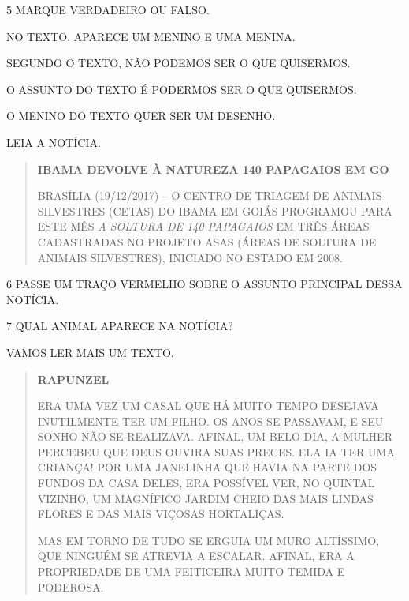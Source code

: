 
\pagebreak

\num{5} MARQUE VERDADEIRO OU FALSO.

\begin{boxlist}
 NO TEXTO, APARECE UM MENINO E UMA MENINA.

 SEGUNDO O TEXTO, NÃO PODEMOS SER O QUE QUISERMOS.

 O ASSUNTO DO TEXTO É PODERMOS SER O QUE QUISERMOS.

 O MENINO DO TEXTO QUER SER UM DESENHO.
\end{boxlist}

LEIA A NOTÍCIA.

\begin{quote}
\textbf{IBAMA DEVOLVE À NATUREZA 140 PAPAGAIOS EM GO}

BRASÍLIA (19/12/2017) -- O CENTRO DE TRIAGEM DE ANIMAIS SILVESTRES
(CETAS) DO IBAMA EM GOIÁS PROGRAMOU PARA ESTE MÊS \emph{A SOLTURA DE 140
PAPAGAIOS} EM TRÊS ÁREAS CADASTRADAS NO PROJETO ASAS (ÁREAS DE SOLTURA
DE ANIMAIS SILVESTRES), INICIADO NO ESTADO EM 2008.~

\end{quote}

\num{6} PASSE UM TRAÇO VERMELHO SOBRE O ASSUNTO PRINCIPAL DESSA NOTÍCIA.

\num{7} QUAL ANIMAL APARECE NA NOTÍCIA?


\pagebreak

VAMOS LER MAIS UM TEXTO.

\begin{quote}
\textbf{RAPUNZEL}

ERA UMA VEZ UM CASAL QUE HÁ MUITO TEMPO DESEJAVA INUTILMENTE TER UM
FILHO. OS ANOS SE PASSAVAM, E SEU SONHO NÃO SE REALIZAVA. AFINAL, UM
BELO DIA, A MULHER PERCEBEU QUE DEUS OUVIRA SUAS PRECES. ELA IA TER UMA
CRIANÇA! POR UMA JANELINHA QUE HAVIA NA PARTE DOS FUNDOS DA CASA DELES,
ERA POSSÍVEL VER, NO QUINTAL VIZINHO, UM MAGNÍFICO JARDIM CHEIO DAS MAIS
LINDAS FLORES E DAS MAIS VIÇOSAS HORTALIÇAS.

MAS EM TORNO DE TUDO SE ERGUIA UM MURO ALTÍSSIMO, QUE NINGUÉM SE ATREVIA
A ESCALAR. AFINAL, ERA A PROPRIEDADE DE UMA FEITICEIRA MUITO TEMIDA E
PODEROSA.

\end{quote}


